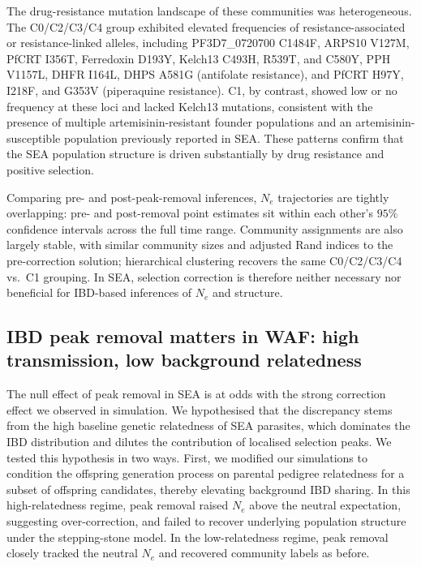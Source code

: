 \documentclass[11pt]{article}
\begin{document}
The drug-resistance mutation landscape of these communities was heterogeneous. The C0/C2/C3/C4 group exhibited elevated frequencies of resistance-associated or resistance-linked alleles, including PF3D7\_0720700 C1484F, ARPS10 V127M, PfCRT I356T, Ferredoxin D193Y, Kelch13 C493H, R539T, and C580Y, PPH V1157L, DHFR I164L, DHPS A581G (antifolate resistance), and PfCRT H97Y, I218F, and G353V (piperaquine resistance). C1, by contrast, showed low or no frequency at these loci and lacked Kelch13 mutations, consistent with the presence of multiple artemisinin-resistant founder populations and an artemisinin-susceptible population previously reported in SEA. These patterns confirm that the SEA population structure is driven substantially by drug resistance and positive selection.

Comparing pre- and post-peak-removal inferences, $N_e$ trajectories are tightly overlapping: pre- and post-removal point estimates sit within each other's $95\%$ confidence intervals across the full time range. Community assignments are also largely stable, with similar community sizes and adjusted Rand indices to the pre-correction solution; hierarchical clustering recovers the same C0/C2/C3/C4 vs.\ C1 grouping. In SEA, selection correction is therefore neither necessary nor beneficial for IBD-based inferences of $N_e$ and structure.

\subsection{IBD peak removal matters in WAF: high transmission, low background relatedness}

The null effect of peak removal in SEA is at odds with the strong correction effect we observed in simulation. We hypothesised that the discrepancy stems from the high baseline genetic relatedness of SEA parasites, which dominates the IBD distribution and dilutes the contribution of localised selection peaks. We tested this hypothesis in two ways. First, we modified our simulations to condition the offspring generation process on parental pedigree relatedness for a subset of offspring candidates, thereby elevating background IBD sharing. In this high-relatedness regime, peak removal raised $N_e$ above the neutral expectation, suggesting over-correction, and failed to recover underlying population structure under the stepping-stone model. In the low-relatedness regime, peak removal closely tracked the neutral $N_e$ and recovered community labels as before.
\end{document}

